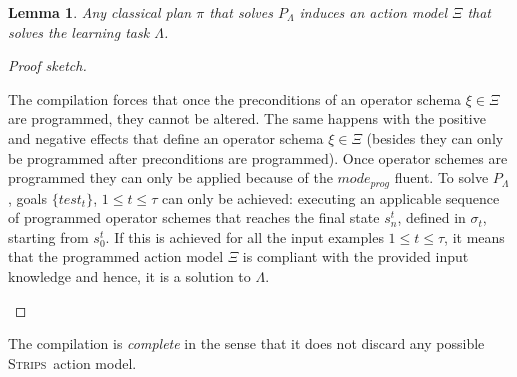 \documentclass[letterpaper]{article} %
\newcommand{\strips}{\textsc{Strips}}     %
\newtheorem{lemma}[theorem]{Lemma}
\begin{document}
\begin{lemma}
Any classical plan $\pi$ that solves $P_{\Lambda}$ induces an action model $\Xi$ that solves the learning task $\Lambda$.
\end{lemma}

\begin{proof}[Proof sketch]
\begin{small}
The compilation forces that once the preconditions of an operator schema $\xi \in \Xi$ are programmed, they cannot be altered. The same happens with the positive and negative effects that define an operator schema $\xi \in \Xi$ (besides they can only be programmed after preconditions are programmed). Once operator schemes are programmed they can only be applied because of the $mode_{prog}$ fluent. To solve $P_{\Lambda}$, goals $\{test_t\}$, {\small $1\leq t\leq \tau$} can only be achieved: executing an applicable sequence of programmed operator schemes that reaches the final state $s_n^t$, defined in $\sigma_t$, starting from $s_0^t$. If this is achieved for all the input examples {\small $1\leq t\leq \tau$}, it means that the programmed action model $\Xi$ is compliant with the provided input knowledge and hence, it is a solution to $\Lambda$.
\end{small}
\end{proof}

The compilation is {\em complete} in the sense that it does not discard any possible \strips\ action model.
\end{document}
